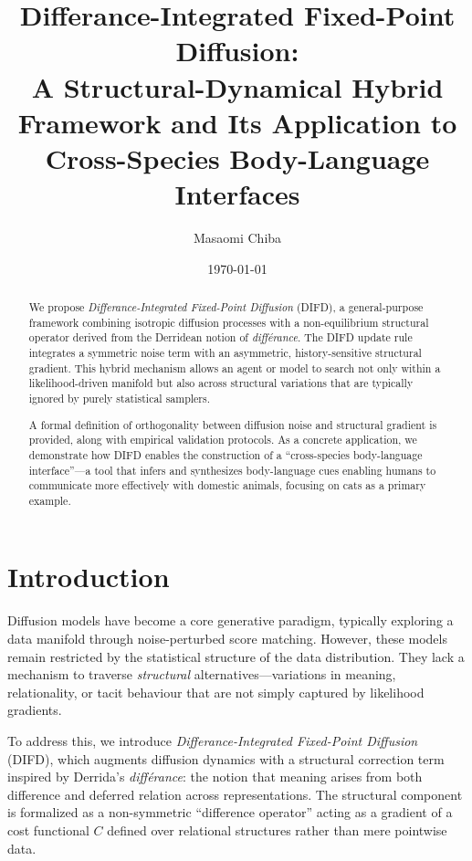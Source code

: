 \documentclass[11pt]{article}
\title{Differance-Integrated Fixed-Point Diffusion: \\
A Structural-Dynamical Hybrid Framework and Its Application to Cross-Species Body-Language Interfaces}
\author{Masaomi Chiba}
\date{\today}
\begin{document}
\maketitle

\begin{abstract}
We propose \emph{Differance-Integrated Fixed-Point Diffusion} (DIFD), a general-purpose 
framework combining isotropic diffusion processes with a non-equilibrium structural operator 
derived from the Derridean notion of \emph{diff\'erance}. The DIFD update rule integrates 
a symmetric noise term with an asymmetric, history-sensitive structural gradient.
This hybrid mechanism allows an agent or model to search not only within a 
likelihood-driven manifold but also across structural variations that are typically 
ignored by purely statistical samplers.

A formal definition of orthogonality between diffusion noise and structural gradient is 
provided, along with empirical validation protocols. As a concrete application, we 
demonstrate how DIFD enables the construction of a ``cross-species body-language 
interface''---a tool that infers and synthesizes body-language cues enabling humans to 
communicate more effectively with domestic animals, focusing on cats as a primary example.
\end{abstract}

\section{Introduction}

Diffusion models have become a core generative paradigm, typically exploring a data 
manifold through noise-perturbed score matching. However, these models remain restricted 
by the statistical structure of the data distribution. They lack a mechanism to traverse 
\emph{structural} alternatives---variations in meaning, relationality, or tacit behaviour 
that are not simply captured by likelihood gradients.

To address this, we introduce \emph{Differance-Integrated Fixed-Point Diffusion} (DIFD), 
which augments diffusion dynamics with a structural correction term inspired by Derrida's 
\emph{diff\'erance}: the notion that meaning arises from both difference and deferred 
relation across representations. The structural component is formalized as a non-symmetric 
``difference operator'' acting as a gradient of a cost functional $C$ defined over 
relational structures rather than mere pointwise data.
\end{document}
